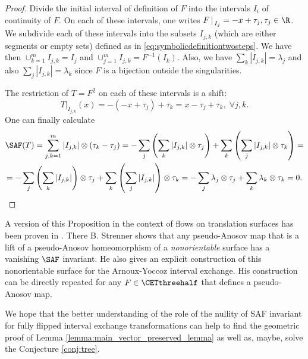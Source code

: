 \documentclass[12pt]{article}
\theoremstyle{definition}
\begin{document}
\begin{proof}
Divide the initial interval of definition of $F$ into the intervals $I_i$ of continuity of $F$. On each of these intervals, one writes 
 $F \left| \right. _{I_j}=-x+\tau_j, \tau_j \in \R$. We subdivide each of these intervals into the subsets $I_{j,k}$ (which are either segments or  empty sets) defined as in \eqref{eq:symbolicdefinitiontwosteps}. We have then $\cup_{k=1}^m I_{j,k}= I_j$ and $\cup_{j=1}^m I_{j,k}=F^{-1}(I_k)$. Also, we have $\sum_k |I_{j,k}|=\lambda_j$ and also $\sum_j |I_{j,k}|=\lambda_k$ since $F$ is a bijection outside the singularities.

The restriction of $T=F^2$ on each of these intervals is a shift: 
\begin{equation*}
T\left|\right._{I_{j,k}}(x)= - (-x+\tau_j) + \tau_k = x - \tau_j + \tau_k, \; \forall j,k.
\end{equation*}
One can finally calculate
\begin{multline*}
\SAF(T)=\sum_{j,k=1}^m |I_{j,k}| \otimes (\tau_k-\tau_j)=- \sum_j \left( \sum_k |I_{j,k}| \otimes \tau_j \right) + \sum_k \left( \sum_j |I_{j,k}| \otimes \tau_k \right) =\\
= - \sum_j \left( \sum_k |I_{j,k}|  \right) \otimes \tau_j + \sum_k \left( \sum_j |I_{j,k}| \right) \otimes \tau_k = -\sum_j \lambda_j \otimes \tau_j + \sum_k \lambda_k \otimes \tau_k = 0.
\end{multline*}
\end{proof}


A version of this Proposition in the context of flows on translation surfaces has been proven in \cite{S18}. There B. Strenner shows that any pseudo-Anosov map that is a lift of a pseudo-Anosov homeomorphism of a \emph{nonorientable} surface has a vanishing $\SAF$ invariant. He also gives an explicit construction of this nonorientable surface for the Arnoux-Yoccoz interval exchange. His construction can be directly repeated for any $F \in \CETthreehalf$ that defines a pseudo-Anosov map. 

We hope that the better understanding of the role of the nullity of SAF invariant for fully flipped interval exchange transformations can help to find the geometric proof of Lemma \ref{lemma:main_vector_preserved_lemma} as well as, maybe, solve the Conjecture \ref{conj:tree}.
\end{document}
